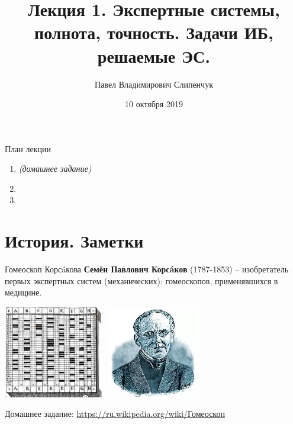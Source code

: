 


\title{Лекция 1. Экспертные системы, полнота, точность. Задачи ИБ, решаемые ЭС.}
\date{10 октября 2019}
\author{Павел Владимирович Слипенчук}


  \maketitle
    
  \begin{frame}{План лекции}
    \begin{enumerate}
    \item {} \textit{(домашнее задание)}
    \item {}
    \item {}
	\end{enumerate}
 \end{frame}
 
 \section{История. Заметки}\label{section:history_remarks}
  
  \begin{frame}{Гомеоскоп Корсáкова}
    \textbf{Семён Павлович Корсáков}
    (1787-1853) 
    -- изобретатель первых экспертных систем 
    (механических): гомеоскопов, применявшихся в медицине.  
    \begin{center}
    		\includegraphics[width=4.5cm]{../pic/gomeoskop.png}\centering
    		\includegraphics[width=4cm]{../pic/korsakov.png}\centering
    \end{center}
    Домашнее задание: \url{https://ru.wikipedia.org/wiki/Гомеоскоп}
  \end{frame}
  
